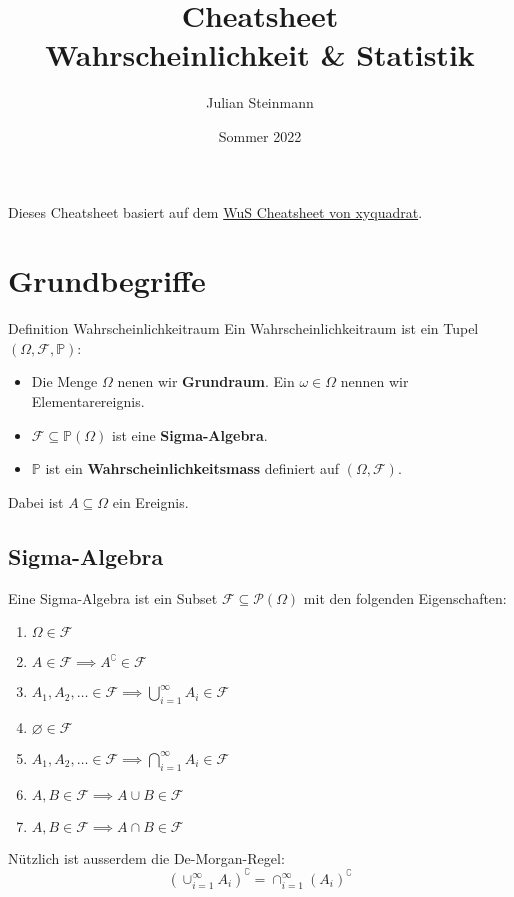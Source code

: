 \documentclass[a4paper,10pt]{article}
\title{Cheatsheet\\ Wahrscheinlichkeit \& Statistik}
\author{Julian Steinmann}
\date{\vspace{-10pt}Sommer 2022}
\def\P{\mathbb{P}}
\def\F{\mathcal{F}}
\begin{document}


Dieses Cheatsheet basiert auf dem \href{https://github.com/XYQuadrat/eth-cheatsheets}{WuS Cheatsheet von xyquadrat}.

\section{Grundbegriffe}
\begin{subbox}{Definition Wahrscheinlichkeitraum}
	Ein Wahrscheinlichkeitraum ist ein Tupel \((\Omega, \F, \P)\):
	\begin{itemize}
		\item Die Menge \(\Omega\) nenen wir \textbf{Grundraum}. Ein \(\omega \in \Omega\) nennen wir Elementarereignis.
		\item \(\F \subseteq \P(\Omega)\) ist eine \textbf{Sigma-Algebra}.
		\item \(\P\) ist ein \textbf{Wahrscheinlichkeitsmass} definiert auf \((\Omega, \F)\).
	\end{itemize}
	Dabei ist \(A \subseteq \Omega\) ein Ereignis.
\end{subbox}

\subsection{Sigma-Algebra}
Eine Sigma-Algebra ist ein Subset \(\F \subseteq \mathcal{P}(\Omega)\) mit den folgenden Eigenschaften:
\begin{enumerate}
	\item \(\Omega \in \F\)
	\item \(A \in \F \implies A^\complement \in \F\)
	\item \(A_1, A_2, \ldots \in \F \implies \bigcup_{i=1}^\infty A_i \in \F\)
	\item \(\varnothing \in \F\)
	\item \(A_1, A_2, \ldots \in \F \implies \bigcap_{i=1}^\infty A_i \in \F\)
	\item \(A, B \in \F \implies A \cup B \in \F\)
	\item \(A, B \in \F \implies A \cap B \in \F\)
\end{enumerate}
Nützlich ist ausserdem die De-Morgan-Regel: \[(\cup_{i=1}^\infty A_i)^\complement = \cap_{i=1}^\infty(A_i)^\complement\]
\end{document}
